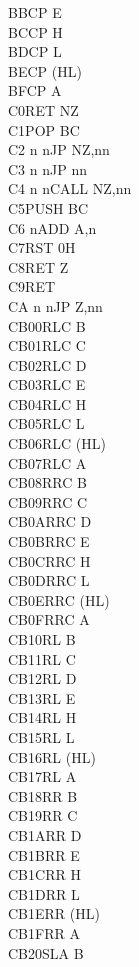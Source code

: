 \documentclass[oneside,a4paper]{book}
\begin{document}
\begin{multicols}{3}
{\begin{tabbing}
BB\>CP E\\
BC\>CP H\\
BD\>CP L\\
BE\>CP (HL)\\
BF\>CP A\\
C0\>RET NZ\\
C1\>POP BC\\
C2 n n\>JP NZ,nn\\
C3 n n\>JP nn\\
C4 n n\>CALL NZ,nn\\
C5\>PUSH BC\\
C6 n\>ADD A,n\\
C7\>RST 0H\\
C8\>RET Z\\
C9\>RET\\
CA n n\>JP Z,nn\\
CB00\>RLC B\\
CB01\>RLC C\\
CB02\>RLC D\\
CB03\>RLC E\\
CB04\>RLC H\\
CB05\>RLC L\\
CB06\>RLC (HL)\\
CB07\>RLC A\\
CB08\>RRC B\\
CB09\>RRC C\\
CB0A\>RRC D\\
CB0B\>RRC E\\
CB0C\>RRC H\\
CB0D\>RRC L\\
CB0E\>RRC (HL)\\
CB0F\>RRC A\\
CB10\>RL B\\
CB11\>RL C\\
CB12\>RL D\\
CB13\>RL E\\
CB14\>RL H\\
CB15\>RL L\\
CB16\>RL (HL)\\
CB17\>RL A\\
CB18\>RR B\\
CB19\>RR C\\
CB1A\>RR D\\
CB1B\>RR E\\
CB1C\>RR H\\
CB1D\>RR L\\
CB1E\>RR (HL)\\
CB1F\>RR A\\
CB20\>SLA B\\

\end{tabbing}}
\end{multicols}
\end{document}
